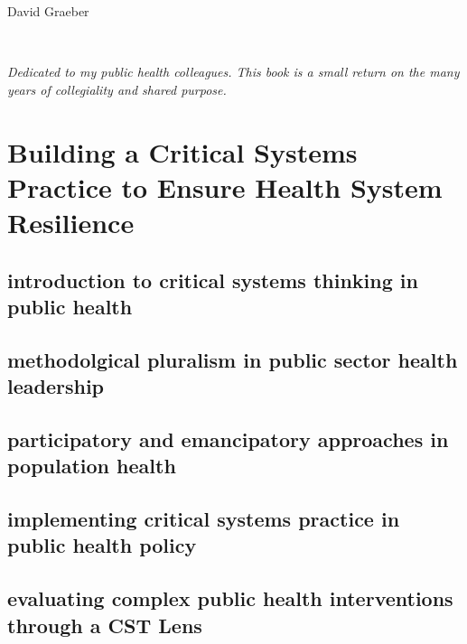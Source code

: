 \documentclass{tufte-book}
\begin{document}
David Graeber


\cleardoublepage
~\vfill
\begin{doublespace}
\noindent\fontsize{18}{22}\selectfont\itshape
\nohyphenation
Dedicated to my public health colleagues. This book is a small return on the many years of collegiality and shared purpose.
\end{doublespace}
\vfill
\vfill

\cleardoublepage
\mainmatter











%



%
\part[Building A Critical Systems Practice]{Building a Critical Systems Practice to Ensure Health System Resilience}

\chapter{introduction to critical systems thinking in public health}
\chapter{methodolgical pluralism in public sector health leadership}
\chapter{participatory and emancipatory approaches in population health}
\chapter{implementing critical systems practice in public health policy}
\chapter{evaluating complex public health interventions through a CST Lens}
\end{document}
